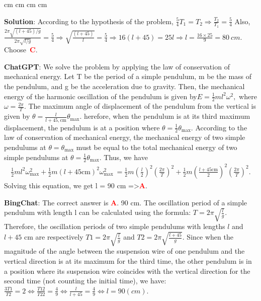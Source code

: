 \documentclass{article}
\begin{document}
{\begin{mdframed}[linewidth=1pt,linecolor=red]
		\begin{oneparchoices}
			 cm
			 cm
			 cm
			 cm
		\end{oneparchoices}
		
		\textbf{Solution}: According to the hypothesis of the problem,	
		$\frac{5}{4} T_{1}=T_{2} \Rightarrow \frac{T_{2}}{T_{1}}=\frac{5}{4}$
		Also,
		$ \frac{2\pi\sqrt{(l+45)/g}}{2\pi\sqrt{l/g}} = \frac{5}{4} \Rightarrow \sqrt{\frac{(l+45)}{l}}=\frac{5}{4} \Rightarrow 16(l+45) = 25 l \Rightarrow l=\frac{16\times25}{9} = 80~cm$. Choose~\textcolor{red}{\textbf{C}}. 
		
		\textbf{ChatGPT}: We solve the problem by applying the law of conservation of mechanical energy. Let T be the period of a simple pendulum, m be the mass of the pendulum, and g be the acceleration due to gravity. Then, the mechanical energy of the harmonic oscillation of the pendulum is given by$E = \frac{1}{2} m l^2 \omega^2,$ where $\omega = \frac{2\pi}{T}$.
		The maximum angle of displacement of the pendulum from the vertical is given by $\theta = \frac{l}{l+45,\mathrm{cm}}\theta_{\max}.$
		herefore, when the pendulum is at its third maximum displacement, the pendulum is at a position where $\theta = \frac{1}{2}\theta_{\max}$.
		According to the law of conservation of mechanical energy, the mechanical energy of two simple pendulums at $\theta = \theta_{\max}$ must be equal to the total mechanical energy of two simple pendulums at $\theta = \frac{1}{2}\theta_{\max}$.
		Thus, we have \begin{align*} \frac{1}{2} m l^2 \omega_{\max}^2 + \frac{1}{2} m (l+45\mathrm{cm})^2 \omega_{\max}^2 \ = \frac{1}{2} m \left(\frac{l}{2}\right)^2 \left(\frac{2\pi}{T}\right)^2 + \frac{1}{2} m \left(\frac{l+45\mathrm{cm}}{2}\right)^2 \left(\frac{2\pi}{T}\right)^2. \end{align*}
		Solving this equation, we get l = 90 cm =>\textcolor{red}{\textbf{A}}.
		
		\textbf{BingChat}: The correct answer is \textcolor{red}{\textbf{A}}. 90 cm. The oscillation period of a simple pendulum with length l can be calculated using the formula: $T = 2\pi\sqrt{\frac{l}{g}}$. Therefore, the oscillation periods of two simple pendulums with lengths $l$ and $l + 45$ cm are respectively $T1 = 2\pi\sqrt{\frac{l}{g}}$ and $T2 = 2\pi\sqrt{\frac{l + 45}{g}}$. Since when the magnitude of the angle between the suspension wire of one pendulum and the vertical direction is at its maximum for the third time, the other pendulum is in a position where its suspension wire coincides with the vertical direction for the second time (not counting the initial time), we have: $\frac{3T1}{T2} = 2 \Leftrightarrow \frac{T12}{T22} = \frac{4}{9} \Leftrightarrow \frac{l}{l + 45} = \frac{4}{9} \Leftrightarrow l = 90 (cm)$.
		

\end{mdframed}}
\end{document}
